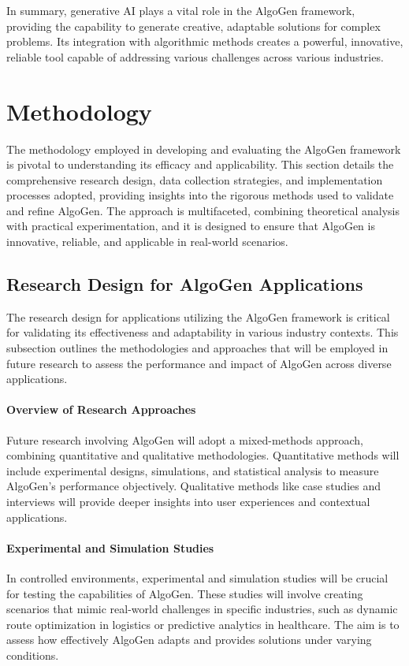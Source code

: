 \documentclass{article}
\begin{document}
In summary, generative AI plays a vital role in the AlgoGen framework, providing the capability to generate creative, adaptable solutions for complex problems. Its integration with algorithmic methods creates a powerful, innovative, reliable tool capable of addressing various challenges across various industries.




\section{Methodology}

The methodology employed in developing and evaluating the AlgoGen framework is pivotal to understanding its efficacy and applicability. This section details the comprehensive research design, data collection strategies, and implementation processes adopted, providing insights into the rigorous methods used to validate and refine AlgoGen. The approach is multifaceted, combining theoretical analysis with practical experimentation, and it is designed to ensure that AlgoGen is innovative, reliable, and applicable in real-world scenarios.


\subsection{Research Design for AlgoGen Applications}

The research design for applications utilizing the AlgoGen framework is critical for validating its effectiveness and adaptability in various industry contexts. This subsection outlines the methodologies and approaches that will be employed in future research to assess the performance and impact of AlgoGen across diverse applications.

\paragraph{Overview of Research Approaches}
Future research involving AlgoGen will adopt a mixed-methods approach, combining quantitative and qualitative methodologies. Quantitative methods will include experimental designs, simulations, and statistical analysis to measure AlgoGen's performance objectively. Qualitative methods like case studies and interviews will provide deeper insights into user experiences and contextual applications.

\paragraph{Experimental and Simulation Studies}
In controlled environments, experimental and simulation studies will be crucial for testing the capabilities of AlgoGen. These studies will involve creating scenarios that mimic real-world challenges in specific industries, such as dynamic route optimization in logistics or predictive analytics in healthcare. The aim is to assess how effectively AlgoGen adapts and provides solutions under varying conditions.
\end{document}
